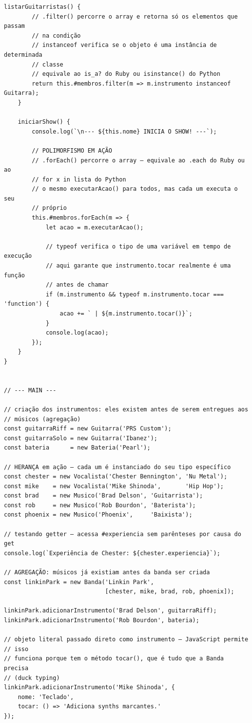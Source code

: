 \begin{lstlisting}[style=javascript, caption={Exemplo de Aplicação de POO em JavaScript}]
    listarGuitarristas() {
        // .filter() percorre o array e retorna só os elementos que passam
        // na condição
        // instanceof verifica se o objeto é uma instância de determinada
        // classe
        // equivale ao is_a? do Ruby ou isinstance() do Python
        return this.#membros.filter(m => m.instrumento instanceof Guitarra);
    }

    iniciarShow() {
        console.log(`\n--- ${this.nome} INICIA O SHOW! ---`);

        // POLIMORFISMO EM AÇÃO
        // .forEach() percorre o array — equivale ao .each do Ruby ou ao
        // for x in lista do Python
        // o mesmo executarAcao() para todos, mas cada um executa o seu
        // próprio
        this.#membros.forEach(m => {
            let acao = m.executarAcao();

            // typeof verifica o tipo de uma variável em tempo de execução
            // aqui garante que instrumento.tocar realmente é uma função
            // antes de chamar
            if (m.instrumento && typeof m.instrumento.tocar === 'function') {
                acao += ` | ${m.instrumento.tocar()}`;
            }
            console.log(acao);
        });
    }
}


// --- MAIN ---

// criação dos instrumentos: eles existem antes de serem entregues aos
// músicos (agregação)
const guitarraRiff = new Guitarra('PRS Custom');
const guitarraSolo = new Guitarra('Ibanez');
const bateria      = new Bateria('Pearl');

// HERANÇA em ação — cada um é instanciado do seu tipo específico
const chester = new Vocalista('Chester Bennington', 'Nu Metal');
const mike    = new Vocalista('Mike Shinoda',       'Hip Hop');
const brad    = new Musico('Brad Delson', 'Guitarrista');
const rob     = new Musico('Rob Bourdon', 'Baterista');
const phoenix = new Musico('Phoenix',     'Baixista');

// testando getter — acessa #experiencia sem parênteses por causa do get
console.log(`Experiência de Chester: ${chester.experiencia}`);

// AGREGAÇÃO: músicos já existiam antes da banda ser criada
const linkinPark = new Banda('Linkin Park',
                             [chester, mike, brad, rob, phoenix]);

linkinPark.adicionarInstrumento('Brad Delson', guitarraRiff);
linkinPark.adicionarInstrumento('Rob Bourdon', bateria);

// objeto literal passado direto como instrumento — JavaScript permite
// isso
// funciona porque tem o método tocar(), que é tudo que a Banda precisa
// (duck typing)
linkinPark.adicionarInstrumento('Mike Shinoda', {
    nome: 'Teclado',
    tocar: () => 'Adiciona synths marcantes.'
});


\end{lstlisting}
